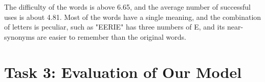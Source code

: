 \documentclass[12pt]{article}  %
\begin{document}
The difficulty of the words is above 6.65, and the average number of successful uses is about 4.81. Most of the words have a single meaning, and the combination of letters is peculiar, such as "EERIE" has three numbers of E, and its near-synonyms are easier to remember than the original words.
















































































\section{{\sc \textbf{Task 3}}: Evaluation of Our Model}
\end{document}
